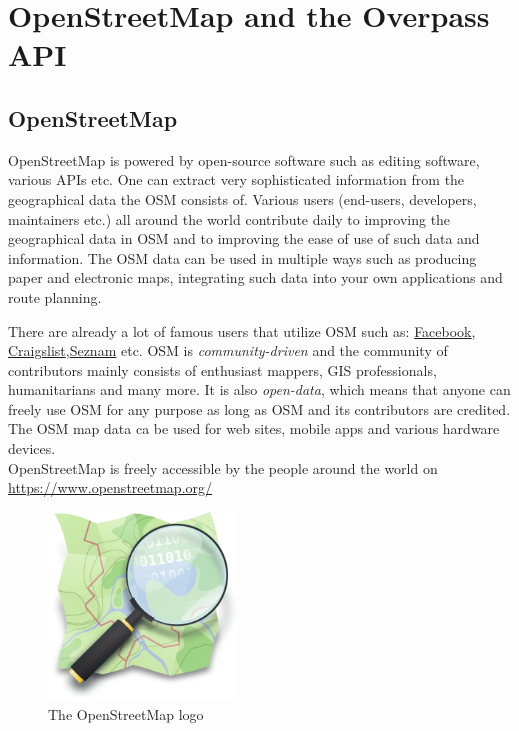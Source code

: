 \section{OpenStreetMap and the Overpass API}
\subsection{OpenStreetMap}
OpenStreetMap is powered by open-source software such as editing software, various APIs etc.
One can extract very sophisticated information from the geographical data the OSM consists of.
Various users (end-users, developers, maintainers etc.) all around the world contribute daily to improving the geographical
data in OSM and to improving the ease of use of such data and information.
The OSM data can be used in multiple ways such as producing paper and electronic maps,
integrating such data into your own applications and route planning.\\
\newline

There are already a lot of famous users that utilize OSM such as:
\href{https://www.facebook.com/}{Facebook},
\href{https://www.craigslist.org/}{Craigslist},\href{https://www.seznam.cz/}{Seznam} etc.
OSM is \textit{community-driven} and the community of contributors mainly consists of enthusiast mappers,
GIS professionals, humanitarians and many more. It is also \textit{open-data}, which means that anyone can freely use
OSM for any purpose as long as OSM and its contributors are credited.
The OSM map data ca be used for web sites, mobile apps and various hardware devices.\\
\newline
OpenStreetMap is freely accessible by the people around the world on \href{https://www.openstreetmap.org/}{https://www.openstreetmap.org/}\\
\newline
\begin{figure}[H]
    \centering
    \includegraphics[width=5cm]{./Figures/Introduction/openstreetmap_logo}
    \caption{The OpenStreetMap logo}
\end{figure}
\pagebreak
